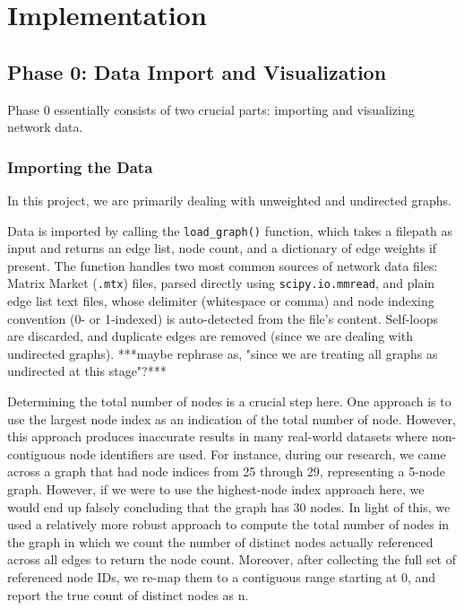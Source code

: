 \documentclass[a4paper,12pt]{amsart}
\numberwithin{equation}{section}
\begin{document}
\section{Implementation}\label{sec:impl}


\subsection{Phase 0: Data Import and Visualization}

Phase 0 essentially consists of two crucial parts: importing and 
visualizing network data.

\subsubsection{Importing the Data}
In this project, we are primarily dealing with unweighted and 
undirected graphs.

Data is imported by calling the \texttt{load\_graph()} function, which 
takes a filepath as input and returns an edge list, node count, and a 
dictionary of edge weights if present. The function handles two most 
common sources of network data files: Matrix Market (\texttt{.mtx}) 
files, parsed directly using \texttt{scipy.io.mmread}, and plain edge 
list text files, whose delimiter (whitespace or comma) and node 
indexing convention (0- or 1-indexed) is auto-detected from the file's 
content. Self-loops are discarded, and duplicate edges are removed (since we are dealing with undirected graphs). ***maybe rephrase as, "since we are treating all graphs as undirected at this stage"?***

Determining the total number of nodes is a crucial step here. One approach is to use the largest node index as an indication of the total number of node. However, this approach produces inaccurate results in many real-world datasets where non-contiguous node identifiers are used. For instance, during our research, we came across a graph that had node indices from 25 through 29, representing a 5-node graph. However, if we were to use the highest-node index approach here, we would end up falsely concluding that the graph has 30 nodes. In light of this, we used a relatively more robust approach to compute the total number of nodes in the graph in which we count the number of distinct nodes actually referenced across all edges to return the node count. Moreover, after collecting the full set of referenced node IDs, we re-map them to a contiguous range starting at 0, and report the true count of distinct nodes as n.
\end{document}
